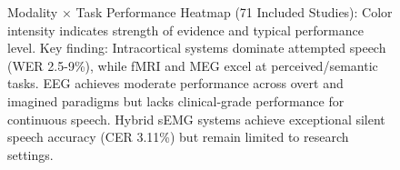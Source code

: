 \begin{figure}[h!]
\caption{Modality × Task Performance Heatmap (71 Included Studies): Color intensity indicates strength of evidence and typical performance level. Key finding: Intracortical systems dominate attempted speech (WER 2.5-9\%), while fMRI and MEG excel at perceived/semantic tasks. EEG achieves moderate performance across overt and imagined paradigms but lacks clinical-grade performance for continuous speech. Hybrid sEMG systems achieve exceptional silent speech accuracy (CER 3.11\%) but remain limited to research settings.}
\label{fig:modality_task_heatmap}
\end{figure}


